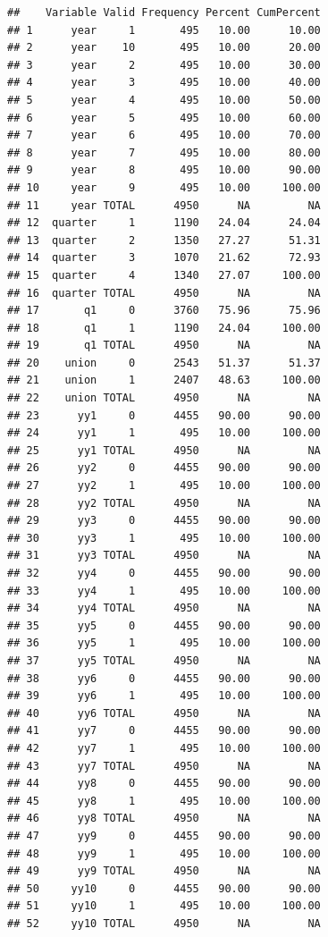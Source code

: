 \documentclass[
]{article}
\begin{document}
\begin{verbatim}
##    Variable Valid Frequency Percent CumPercent
## 1      year     1       495   10.00      10.00
## 2      year    10       495   10.00      20.00
## 3      year     2       495   10.00      30.00
## 4      year     3       495   10.00      40.00
## 5      year     4       495   10.00      50.00
## 6      year     5       495   10.00      60.00
## 7      year     6       495   10.00      70.00
## 8      year     7       495   10.00      80.00
## 9      year     8       495   10.00      90.00
## 10     year     9       495   10.00     100.00
## 11     year TOTAL      4950      NA         NA
## 12  quarter     1      1190   24.04      24.04
## 13  quarter     2      1350   27.27      51.31
## 14  quarter     3      1070   21.62      72.93
## 15  quarter     4      1340   27.07     100.00
## 16  quarter TOTAL      4950      NA         NA
## 17       q1     0      3760   75.96      75.96
## 18       q1     1      1190   24.04     100.00
## 19       q1 TOTAL      4950      NA         NA
## 20    union     0      2543   51.37      51.37
## 21    union     1      2407   48.63     100.00
## 22    union TOTAL      4950      NA         NA
## 23      yy1     0      4455   90.00      90.00
## 24      yy1     1       495   10.00     100.00
## 25      yy1 TOTAL      4950      NA         NA
## 26      yy2     0      4455   90.00      90.00
## 27      yy2     1       495   10.00     100.00
## 28      yy2 TOTAL      4950      NA         NA
## 29      yy3     0      4455   90.00      90.00
## 30      yy3     1       495   10.00     100.00
## 31      yy3 TOTAL      4950      NA         NA
## 32      yy4     0      4455   90.00      90.00
## 33      yy4     1       495   10.00     100.00
## 34      yy4 TOTAL      4950      NA         NA
## 35      yy5     0      4455   90.00      90.00
## 36      yy5     1       495   10.00     100.00
## 37      yy5 TOTAL      4950      NA         NA
## 38      yy6     0      4455   90.00      90.00
## 39      yy6     1       495   10.00     100.00
## 40      yy6 TOTAL      4950      NA         NA
## 41      yy7     0      4455   90.00      90.00
## 42      yy7     1       495   10.00     100.00
## 43      yy7 TOTAL      4950      NA         NA
## 44      yy8     0      4455   90.00      90.00
## 45      yy8     1       495   10.00     100.00
## 46      yy8 TOTAL      4950      NA         NA
## 47      yy9     0      4455   90.00      90.00
## 48      yy9     1       495   10.00     100.00
## 49      yy9 TOTAL      4950      NA         NA
## 50     yy10     0      4455   90.00      90.00
## 51     yy10     1       495   10.00     100.00
## 52     yy10 TOTAL      4950      NA         NA
\end{verbatim}
\end{document}
